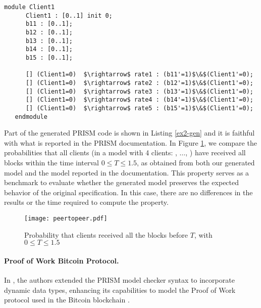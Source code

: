 \begin{lstlisting}[style=prism-color,caption={Part of the generated PRISM program for the Peer-To-Peer Protocol},captionpos=b,label={ex2-gen}]
   module Client1
      Client1 : [0..1] init 0;
      b11 : [0..1]; 
      b12 : [0..1]; 
      b13 : [0..1]; 
      b14 : [0..1]; 
      b15 : [0..1]; 
   
      [] (Client1=0)  $\rightarrow$ rate1 : (b11'=1)$\&$(Client1'=0); 
      [] (Client1=0)  $\rightarrow$ rate2 : (b12'=1)$\&$(Client1'=0); 
      [] (Client1=0)  $\rightarrow$ rate3 : (b13'=1)$\&$(Client1'=0); 
      [] (Client1=0)  $\rightarrow$ rate4 : (b14'=1)$\&$(Client1'=0); 
      [] (Client1=0)  $\rightarrow$ rate5 : (b15'=1)$\&$(Client1'=0); 
   endmodule
   \end{lstlisting}
Part of the generated PRISM code is shown in Listing \ref{ex2-gen} and it is faithful with what is reported in the PRISM documentation. 
In Figure \ref{ex2-res}, we compare the probabilities that all clients (in a model with 4 
clients: , $\ldots$, ) have received all blocks 
within the time interval $0 \leq T \leq 1.5$, as obtained from both our generated model 
and the model reported in the documentation. This property serves as a benchmark to 
evaluate whether the generated model preserves the expected behavior of the original 
specification. In this case, there are no differences in the results or the time required 
to compute the property.

\begin{figure}[h]
   \centering
   \texttt{[image: peertopeer.pdf]}	
   \caption{Probability that clients received all the blocks before $T$, with $0\leq T \leq 1.5$}
   \label{ex2-res}
   \end{figure}

 

\paragraph{Proof of Work Bitcoin Protocol.}
In \cite{DBLP:journals/concurrency/BistarelliNGLMV23}, the authors extended the PRISM model checker syntax to incorporate dynamic data types, enhancing its capabilities to model the Proof of Work protocol used in the Bitcoin blockchain \cite{bitcoin}. 

